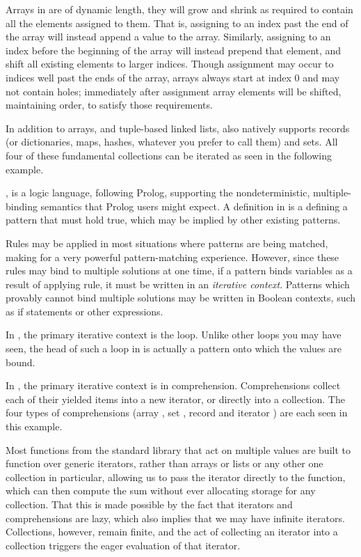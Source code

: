 Arrays in \Trilogy{} are of dynamic length, they will grow and shrink as required
to contain all the elements assigned to them. That is, assigning to an index past
the end of the array will instead append a value to the array. Similarly, assigning
to an index before the beginning of the array will instead prepend that element, and
shift all existing elements to larger indices. Though assignment may occur to indices
well past the ends of the array, arrays always start at index 0 and may not contain
holes; immediately after assignment array elements will be shifted, maintaining order,
to satisfy those requirements.

In addition to arrays, and tuple-based linked lists, \Trilogy{} also natively
supports records (or dictionaries, maps, hashes, whatever you prefer to call them)
and sets. All four of these fundamental collections can be iterated as seen in the
following example.


\Law{}, is a logic language, following Prolog, supporting the nondeterministic,
multiple-binding semantics that Prolog users might expect. A definition in \Law{}
is a  defining a pattern that must hold true, which may be implied by
other existing patterns.

Rules may be applied in most situations where patterns are being matched, making
for a very powerful pattern-matching experience. However, since these rules
may bind to multiple solutions at one time, if a pattern binds variables as
a result of applying rule, it must be written in an \emph{iterative context}.
Patterns which provably cannot bind multiple solutions may be written in Boolean
contexts, such as if statements or other expressions.

In \Prose{}, the primary iterative context is the  loop. Unlike other
 loops you may have seen, the head of such a loop in \Prose{} is actually
a pattern onto which the values are bound.

In \Poetry{}, the primary iterative context is in comprehension. Comprehensions
collect each of their yielded items into a new iterator, or directly into a
collection. The four types of comprehensions (array \op{[]}, set \op{\{\}},
record \op{\{:\}} and iterator \op{\$()}) are each seen in this example.

Most functions from the standard library that act on multiple values are built to
function over generic iterators, rather than arrays or lists or any other one
collection in particular, allowing us to pass the iterator directly to the
 function, which can then compute the sum without ever allocating storage
for any collection. That this is made possible by the fact that iterators
and comprehensions are lazy, which also implies that we may have infinite
iterators. Collections, however, remain finite, and the act of collecting
an iterator into a collection triggers the eager evaluation of that iterator.

